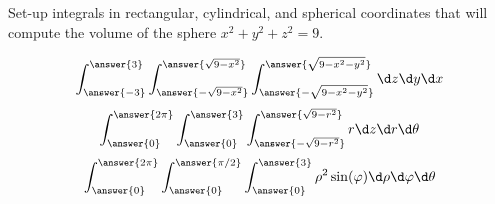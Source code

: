 \documentclass{ximera}
\author{Bart Snapp}
\begin{document}
\begin{exercise}
  Set-up integrals in rectangular, cylindrical, and spherical coordinates that
  will compute the volume of the sphere $x^2+y^2+z^2=9$.
  \begin{prompt}
  \[
  \int_{\answer{-3}}^{\answer{3}}\int_{\answer{-\sqrt{9-x^2}}}^{\answer{\sqrt{9-x^2}}}\int_{\answer{-\sqrt{9-x^2-y^2}}}^{\answer{\sqrt{9-x^2-y^2}}}\d z \d y \d x
  \]
  \[
  \int_{\answer{0}}^{\answer{2\pi}}\int_{\answer{0}}^{\answer{3}}\int_{\answer{-\sqrt{9-r^2}}}^{\answer{\sqrt{9-r^2}}}   r\d z \d r \d \theta
  \]
  \[
  \int_{\answer{0}}^{\answer{2\pi}}\int_{\answer{0}}^{\answer{\pi/2}}\int_{\answer{0}}^{\answer{3}}   \rho^2\sin(\varphi)\d \rho \d \varphi \d \theta
  \]
  \end{prompt}
\end{exercise}
\end{document}
